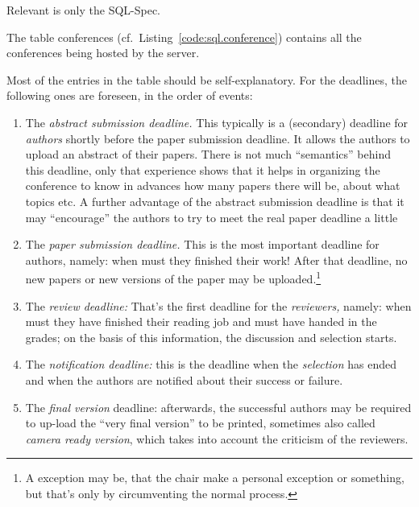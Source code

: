 Relevant is only the SQL-Spec.



The table conferences (cf.\ Listing~\ref{code:sql.conference}) contains all
the conferences being hosted by the server. 



%

Most of the entries in the table should be self-explanatory.  For the
deadlines, the following ones are foreseen, in the order of events:
\begin{enumerate}
\item The \emph{abstract submission deadline.} This typically is a
  (secondary) deadline for \emph{authors} shortly before the paper
  submission deadline.  It allows the authors to upload an abstract of
  their papers. There is not much ``semantics'' behind this deadline, only
  that experience shows that it helps in organizing the conference to know
  in advances how many papers there will be, about what topics etc. A
  further advantage of the abstract submission deadline is that it may
  ``encourage'' the authors to try to meet the real paper deadline a little
\item The \emph{paper submission deadline.} This is the most important
  deadline for authors, namely: when must they finished their work! After
  that deadline, no new papers or new versions of the paper may be
  uploaded.\footnote{A exception may be, that the chair make a personal
    exception or something, but that's only by circumventing the normal
    process.}
\item The \emph{review deadline:} That's the first deadline for the
  \emph{reviewers,} namely: when must they have finished their reading job
  and must have handed in the grades; on the basis of this information, the
  discussion and selection starts.
\item The \emph{notification deadline:} this is the deadline when the
  \emph{selection} has ended and when the authors are notified about their
  success or failure.
\item The \emph{final version} deadline: afterwards, the successful authors
  may be required to up-load the ``very final version'' to be printed,
  sometimes also called \emph{camera ready version}, which takes into
  account the criticism of the reviewers.
\end{enumerate}


